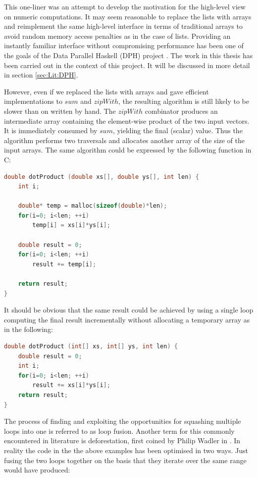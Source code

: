 \documentclass[preamble.tex]{subfiles}
\begin{document}
This one-liner was an attempt to develop the motivation for the high-level view on numeric computations. It may seem reasonable to replace the lists with arrays and reimplement the same high-level interface in terms of traditional arrays to avoid random memory access penalties as in the case of lists. Providing an instantly familiar interface without compromising performance has been one of the goals of the Data Parallel Haskell (DPH) project \cite{PLKC08,CLP+07}. The work in this thesis has been carried out in the context of this project. It will be discussed in more detail in section \ref{sec:Lit:DPH}.

However, even if we replaced the lists with arrays and gave efficient implementations to $sum$ and $zipWith$, the resulting algorithm is still likely to be slower than on written by hand. The $zipWith$ combinator produces an intermediate array containing the element-wise product of the two input vectors. It is immediately consumed by $sum$, yielding the final (scalar) value. Thus the algorithm performs two traversals and allocates another array of the size of the input arrays. The same algorithm could be expressed by the following function in C:

\begin{lstlisting}[basicstyle={\ttfamily},language=C,tabsize=4]
double dotProduct (double xs[], double ys[], int len) {
	int i;

	double* temp = malloc(sizeof(double)*len);
	for(i=0; i<len; ++i)
		temp[i] = xs[i]*ys[i];

	double result = 0;
	for(i=0; i<len; ++i)
		result += temp[i];

	return result;
}
\end{lstlisting}


It should be obvious that the same result could be achieved by using a single loop computing the final result incrementally without allocating a temporary array as in the following:

\begin{lstlisting}[basicstyle={\ttfamily},language=C,tabsize=4]
double dotProduct (int[] xs, int[] ys, int len) {
	double result = 0;
	int i;
	for(i=0; i<len; ++i)
		result += xs[i]*ys[i];
	return result;
}
\end{lstlisting}


The process of finding and exploiting the opportunities for squashing multiple loops into one is referred to as loop fusion. Another term for this commonly encountered in literature is deforestation, first coined by Philip Wadler in \cite{Wad90}. In reality the code in the the above examples has been optimised in two ways. Just fusing the two loops together on the basis that they iterate over the same range would have produced:
\end{document}
